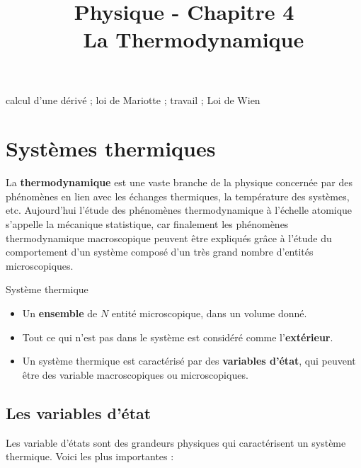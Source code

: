 \documentclass[11pt,a4paper]{article}
\title{\large Physique - Chapitre 4 \\ \LARGE  La Thermodynamique}
\date{}
\author{}
\begin{document}
\maketitle
\vspace{-1cm}
\begin{tcolorbox}[title=Notions de la classe de première à rappeler]
calcul d'une dérivé ; loi de Mariotte ; travail ; Loi de Wien
\end{tcolorbox}
\tableofcontents

\section{Systèmes thermiques}

La \textbf{thermodynamique} est une vaste branche de la physique concernée par des phénomènes en lien avec les échanges thermiques, la température des systèmes, etc. Aujourd'hui l'étude des phénomènes thermodynamique à l'échelle atomique s'appelle la mécanique statistique, car finalement les phénomènes thermodynamique macroscopique peuvent être expliqués grâce à l'étude du comportement d'un système composé d'un très grand nombre d'entités microscopiques. 

\begin{defn}{Système thermique}
\begin{itemize}
    \item Un \textbf{ensemble} de $N$ entité microscopique, dans un volume donné. 
    \item Tout ce qui n'est pas dans le système est considéré comme l'\textbf{extérieur}. 
    \item Un système thermique est caractérisé par des \textbf{variables d'état}, qui peuvent être des variable macroscopiques ou microscopiques. 
\end{itemize}
\end{defn}

\subsection{Les variables d'état}
Les variable d'états sont des grandeurs physiques qui caractérisent un système thermique. Voici les plus importantes :  
\end{document}
